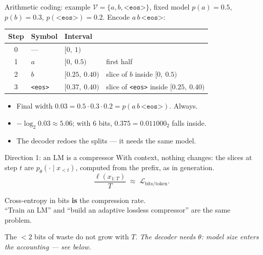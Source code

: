 \documentclass[11pt,aspectratio=169]{beamer}
\newcommand{\V}{\mathcal{V}}
\newcommand{\Lc}{\mathcal{L}}
\newcommand{\ptheta}{p_{\theta}}
\newcommand{\hook}[1]{{\small\textcolor{gray!60!black}{\textit{#1}}}}
\newcommand{\eos}{\texttt{<eos>}}
\begin{document}
\begin{frame}{Arithmetic coding: example}
  $\V = \{a,b,\eos\}$, fixed model $p(a) = 0.5$, $p(b) = 0.3$, $p(\eos) = 0.2$.
  Encode $a\,b\,\eos$:

  \vspace{0.6em}
  \begin{center}
  \begin{tabular}{@{}clll@{}}
    \toprule
    Step & Symbol & Interval & \\
    \midrule
    0 & --- & $[0,\ 1)$ & \\
    1 & $a$ & $[0,\ 0.5)$ & first half \\
    2 & $b$ & $[0.25,\ 0.40)$ & slice of $b$ inside $[0,\ 0.5)$ \\
    3 & \eos & $[0.37,\ 0.40)$ & slice of \eos{} inside $[0.25,\ 0.40)$ \\
    \bottomrule
  \end{tabular}
  \end{center}

  \vspace{0.6em}
  \begin{itemize}
    \item Final width $0.03 = 0.5\cdot 0.3\cdot 0.2 = p(a\,b\,\eos)$. Always.
    \item $-\log_2 0.03\approx 5.06$; with 6 bits, $0.375 = 0.011000_2$ falls inside.
    \item The decoder redoes the splits --- it needs the same model.
  \end{itemize}
\end{frame}

\begin{frame}{Direction 1: an LM is a compressor}
  With context, nothing changes: the slices at step $t$ are $\ptheta(\cdot\mid x_{<t})$,
  computed from the prefix, as in generation.
  \[
    \frac{\ell(x_{1:T})}{T} \;\approx\; \Lc_{\text{bits/token}} .
  \]

  \vspace{0.8em}
  \begin{block}{}
    Cross-entropy in bits \textbf{is} the compression rate.\\
    ``Train an LM'' and ``build an adaptive lossless compressor'' are the same problem.
  \end{block}

  \vspace{0.8em}
  The $<2$ bits of waste do not grow with $T$.
  \hook{The decoder needs $\theta$: model size enters the accounting --- see below.}
\end{frame}
\end{document}
